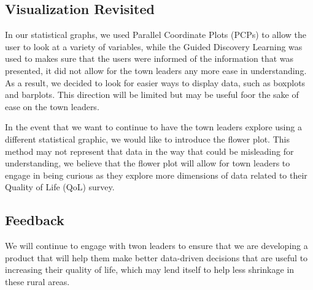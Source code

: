 \documentclass[letterpaper,inpress]{jdsart}
\begin{document}
\subsection{Visualization Revisited}

In our statistical graphs, we used Parallel Coordinate Plots (PCPs) to allow the user to look at a variety of variables, while the Guided Discovery Learning was used to makes sure that the users were informed of the information that was presented, it did not allow for the town leaders any more ease in understanding. As a result, we decided to look for easier ways to display data, such as boxplots and barplots. This direction will be limited but may be useful foor the sake of ease on the town leaders.

In the event that we want to continue to have the town leaders explore using a different statistical graphic, we would like to introduce the flower plot. This method may not represent that data in the way that could be misleading for understanding, we believe that the flower plot will allow for town leaders to engage in being curious as they explore more dimensions of data related to their Quality of Life (QoL) survey.

\subsection{Feedback}

We will continue to engage with twon leaders to ensure that we are developing a product that will help them make better data-driven decisions that are useful to increasing their quality of life, which may lend itself to help less shrinkage in these rural areas.



\end{document}
